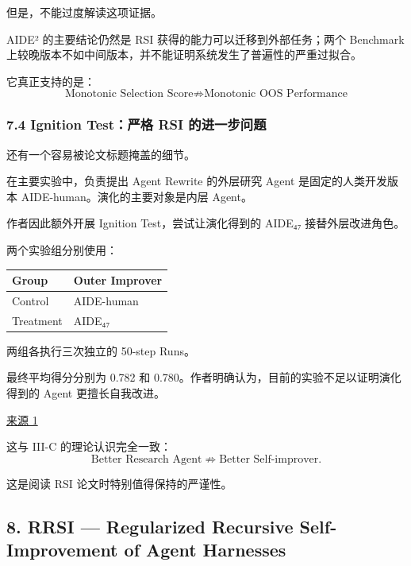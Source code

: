 但是，不能过度解读这项证据。

AIDE² 的主要结论仍然是 RSI 获得的能力可以迁移到外部任务；两个 Benchmark 上较晚版本不如中间版本，并不能证明系统发生了普遍性的严重过拟合。

它真正支持的是：
\[\boxed{
\text{Monotonic Selection Score}
\not\Rightarrow
\text{Monotonic OOS Performance}
}\]

\hypertarget{part-3-44-0001-ignition-testux4e25ux683c-rsi-ux7684ux8fdbux4e00ux6b65ux95eeux9898}{%
\subsubsection{7.4 Ignition Test：严格 RSI 的进一步问题}\label{part-3-44-0001-ignition-testux4e25ux683c-rsi-ux7684ux8fdbux4e00ux6b65ux95eeux9898}}

还有一个容易被论文标题掩盖的细节。

在主要实验中，负责提出 Agent Rewrite 的外层研究 Agent 是固定的人类开发版本 AIDE-human。演化的主要对象是内层 Agent。

作者因此额外开展 Ignition Test，尝试让演化得到的 AIDE₄₇ 接替外层改进角色。

两个实验组分别使用：

\begin{readertable}
\begin{longtable}[]{@{}
  >{\raggedright\arraybackslash}p{}
  >{\raggedright\arraybackslash}p{}@{}}
\toprule
Group & Outer Improver \\
\midrule
\endhead
Control & AIDE-human \\
Treatment & AIDE₄₇ \\
\bottomrule
\end{longtable}
\end{readertable}

两组各执行三次独立的 50-step Runs。

最终平均得分分别为 0.782 和 0.780。作者明确认为，目前的实验不足以证明演化得到的 Agent 更擅长自我改进。

\href{https://arxiv.org/html/2609.26457v1}{来源 1}

这与 III-C 的理论认识完全一致：
\[\text{Better Research Agent}
\not\Rightarrow
\text{Better Self-improver}.\]

这是阅读 RSI 论文时特别值得保持的严谨性。

\hypertarget{part-3-44-0001-rrsi-regularized-recursive-self-improvement-of-agent-harnesses}{%
\subsection{8. RRSI --- Regularized Recursive Self-Improvement of Agent Harnesses}\label{part-3-44-0001-rrsi-regularized-recursive-self-improvement-of-agent-harnesses}}

